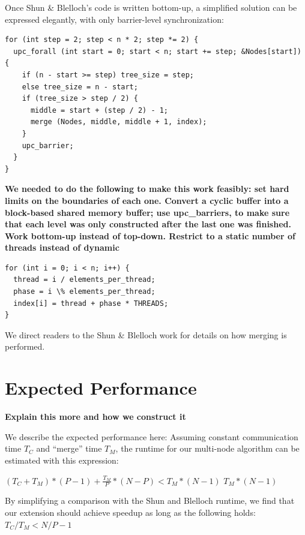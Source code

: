 \documentclass[10pt]{article}
\begin{document}
Once Shun \& Blelloch's code is written bottom-up, a simplified solution can be expressed elegantly, with only barrier-level synchronization:

\lstset{language=C}
\begin{minipage}{\linewidth}
\begin{lstlisting}
for (int step = 2; step < n * 2; step *= 2) {
  upc_forall (int start = 0; start < n; start += step; &Nodes[start]) {
    if (n - start >= step) tree_size = step;
    else tree_size = n - start;
    if (tree_size > step / 2) {
      middle = start + (step / 2) - 1;
      merge (Nodes, middle, middle + 1, index);
    }
    upc_barrier;
  }
}
\end{lstlisting}
\end{minipage}

\textbf{%
We needed to do the following to make this work feasibly:
set hard limits on the boundaries of each one.
Convert a cyclic buffer into a block-based shared memory buffer;
use upc\_barriers, to make sure that each level was only constructed after the last one was finished.
Work bottom-up instead of top-down.
Restrict to a static number of threads instead of dynamic
}

\begin{minipage}{\linewidth}
\begin{lstlisting}
for (int i = 0; i < n; i++) {
  thread = i / elements_per_thread;
  phase = i \% elements_per_thread;
  index[i] = thread + phase * THREADS;
}
\end{lstlisting}
\end{minipage}

We direct readers to the Shun \& Blelloch work for details on how merging is performed.

\section{Expected Performance}

\textbf{Explain this more and how we construct it}

We describe the expected performance here:
Assuming constant communication time $T_C$ and ``merge'' time $T_M$, the runtime for our multi-node algorithm can be estimated with this expression:

$\left( T_{ C }+T_{ M } \right) *(P-1)+\frac{T_M}{P}*(N-P)<T_{ M }*(N-1)$
$T_{ M } * (N-1)$

By simplifying a comparison with the Shun and Blelloch runtime, we find that our extension should achieve speedup as long as the following holds:
$T_C / T_M < N / P - 1$
\end{document}
